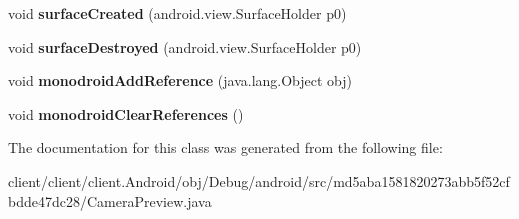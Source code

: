 \begin{DoxyCompactItemize}
\item 
\hypertarget{classmd5aba1581820273abb5f52cfbdde47dc28_1_1CameraPreview_ac222dbdd41e4659e6b2a3be3ddd4e599}{}void {\bfseries surface\+Created} (android.\+view.\+Surface\+Holder p0)\label{classmd5aba1581820273abb5f52cfbdde47dc28_1_1CameraPreview_ac222dbdd41e4659e6b2a3be3ddd4e599}

\item 
\hypertarget{classmd5aba1581820273abb5f52cfbdde47dc28_1_1CameraPreview_ac5046b672ed460f73cf0eca8fba8c30c}{}void {\bfseries surface\+Destroyed} (android.\+view.\+Surface\+Holder p0)\label{classmd5aba1581820273abb5f52cfbdde47dc28_1_1CameraPreview_ac5046b672ed460f73cf0eca8fba8c30c}

\item 
\hypertarget{classmd5aba1581820273abb5f52cfbdde47dc28_1_1CameraPreview_affd59772f3e5c8c1ce15ab6d058d5eb6}{}void {\bfseries monodroid\+Add\+Reference} (java.\+lang.\+Object obj)\label{classmd5aba1581820273abb5f52cfbdde47dc28_1_1CameraPreview_affd59772f3e5c8c1ce15ab6d058d5eb6}

\item 
\hypertarget{classmd5aba1581820273abb5f52cfbdde47dc28_1_1CameraPreview_a2695667d24e66413fa7e99044e05179e}{}void {\bfseries monodroid\+Clear\+References} ()\label{classmd5aba1581820273abb5f52cfbdde47dc28_1_1CameraPreview_a2695667d24e66413fa7e99044e05179e}

\end{DoxyCompactItemize}


The documentation for this class was generated from the following file\+:\begin{DoxyCompactItemize}
\item 
client/client/client.\+Android/obj/\+Debug/android/src/md5aba1581820273abb5f52cfbdde47dc28/Camera\+Preview.\+java\end{DoxyCompactItemize}

